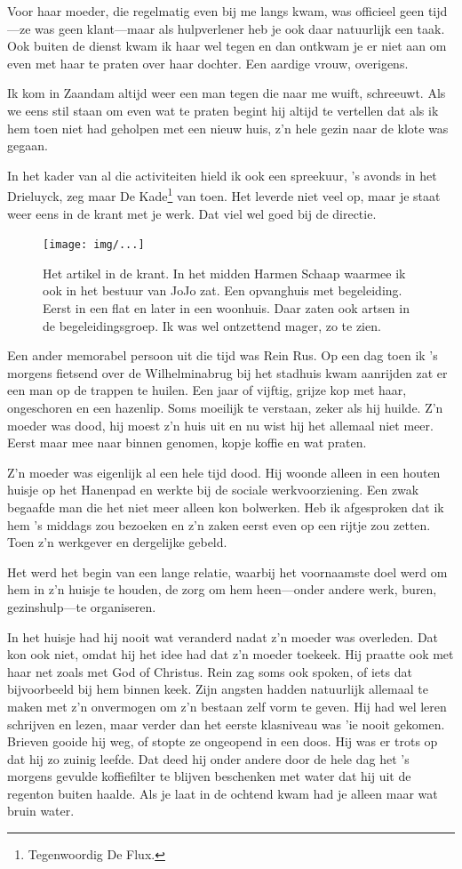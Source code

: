 \documentclass[12pt,twoside]{memoir}
\begin{document}
Voor haar moeder, die regelmatig even bij me langs kwam, was officieel geen tijd---ze was geen klant---maar als hulpverlener heb je ook daar natuurlijk een taak. Ook buiten de dienst kwam ik haar wel tegen en dan ontkwam je er niet aan om even met haar te praten over haar dochter. Een aardige vrouw, overigens.

Ik kom in Zaandam altijd weer een man tegen die naar me wuift, schreeuwt. Als we eens stil staan om even wat te praten begint hij altijd te vertellen dat als ik hem toen niet had geholpen met een nieuw huis, z’n hele gezin naar de klote was gegaan.

In het kader van al die activiteiten hield ik ook een spreekuur, 's avonds in het Drieluyck, zeg maar De Kade\footnote{Tegenwoordig De Flux.} van toen. Het leverde niet veel op, maar je staat weer eens in de krant met je werk. Dat viel wel goed bij de directie. 

\begin{figure}[t]
\texttt{[image: img/...]}
\caption{Het artikel in de krant. In het midden Harmen Schaap waarmee ik ook in het bestuur van JoJo zat. Een opvanghuis met begeleiding. Eerst in een flat en later in een woonhuis. Daar zaten ook artsen in de begeleidingsgroep. Ik was wel ontzettend mager, zo te zien.}
\end{figure}

Een ander memorabel persoon uit die tijd was Rein Rus. Op een dag toen ik ’s morgens fietsend over de Wilhelminabrug bij het stadhuis kwam aanrijden zat er een man op de trappen te huilen. Een jaar of vijftig, grijze kop met haar, ongeschoren en een hazenlip. Soms moeilijk te verstaan, zeker als hij huilde. Z’n moeder was dood, hij moest z’n huis uit en nu wist hij het allemaal niet meer. Eerst maar mee naar binnen genomen, kopje koffie en wat praten. 

Z’n moeder was eigenlijk al een hele tijd dood. Hij woonde alleen in een houten huisje op het Hanenpad en werkte bij de sociale werkvoorziening. Een zwak begaafde man die het niet meer alleen kon bolwerken. Heb ik afgesproken dat ik hem ’s middags zou bezoeken en z’n zaken eerst even op een rijtje zou zetten. Toen z'n werkgever en dergelijke gebeld. 

Het werd het begin van een lange relatie, waarbij het voornaamste doel werd om hem in z’n huisje te houden, de zorg om hem heen---onder andere werk, buren, gezinshulp---te organiseren. 

In het huisje had hij nooit wat veranderd nadat z’n moeder was overleden. Dat kon ook niet, omdat hij het idee had dat z’n moeder toekeek. Hij praatte ook met haar net zoals met God of Christus. Rein zag soms ook spoken, of iets dat bijvoorbeeld bij hem binnen keek. Zijn angsten hadden natuurlijk allemaal te maken met z’n onvermogen om z’n bestaan zelf vorm te geven. Hij had wel leren schrijven en lezen, maar verder dan het eerste klasniveau was 'ie nooit gekomen. Brieven gooide hij weg, of stopte ze ongeopend in een doos. Hij was er trots op dat hij zo zuinig leefde. Dat deed hij onder andere door de hele dag het ’s morgens gevulde koffiefilter te blijven beschenken met water dat hij uit de regenton buiten haalde. Als je laat in de ochtend kwam had je alleen maar wat bruin water. 
\end{document}
